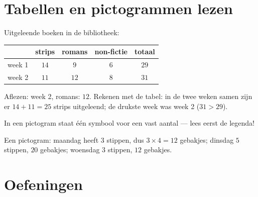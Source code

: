 \section{Tabellen en pictogrammen lezen}

\begin{example}\label{ex:g3:problems:table}
Uitgeleende boeken in de bibliotheek:
\begin{center}
\renewcommand{\arraystretch}{1.3}
\begin{tabular}{l|cccc}
 & strips & romans & non-fictie & totaal \\
\hline
week 1 & $14$ & $9$ & $6$ & $29$ \\
week 2 & $11$ & $12$ & $8$ & $31$ \\
\end{tabular}
\end{center}
Aflezen: week 2, romans: $12$. Rekenen met de tabel: in de twee weken
samen zijn er $14 + 11 = 25$ strips uitgeleend; de drukste week was week 2
($31 > 29$).
\end{example}

\begin{example}\label{ex:g3:problems:pictogram}
In een pictogram staat één symbool voor een vast aantal --- lees eerst de
legenda!

\begin{omfigure}

{\small Een pictogram: maandag heeft $3$ stippen, dus $3 \times 4 = 12$
gebakjes; dinsdag $5$ stippen, $20$ gebakjes; woensdag $3$ stippen, $12$
gebakjes.}
\end{omfigure}
\end{example}

\section{Oefeningen}


